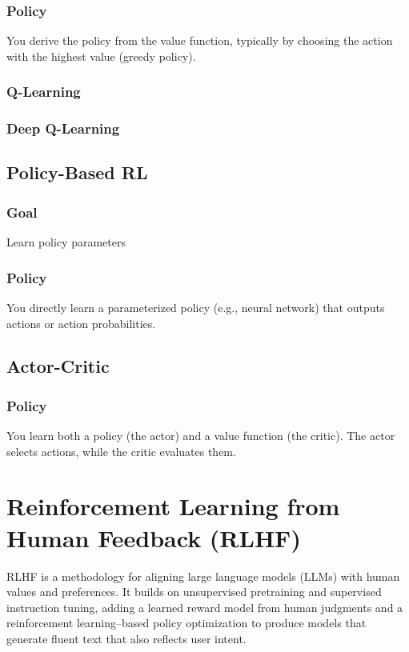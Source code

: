 \documentclass{article}
\begin{document}
\subsubsection{Policy} You derive the policy from the value function, typically by choosing the action with the highest value (greedy policy).

\subsubsection{Q-Learning}

\subsubsection{Deep Q-Learning}

\subsection{Policy-Based RL}

\subsubsection{Goal} Learn policy parameters

\subsubsection{Policy} You directly learn a parameterized policy (e.g., neural network) that outputs actions or action probabilities.

\subsection{Actor-Critic}

\subsubsection{Policy} You learn both a policy (the actor) and a value function (the critic). The actor selects actions, while the critic evaluates them.

\clearpage\newpage
\section{Reinforcement Learning from Human Feedback (RLHF)}

RLHF is a methodology for aligning large language models (LLMs) with human values and preferences. It builds on unsupervised pretraining and supervised instruction tuning, adding a learned reward model from human judgments and a reinforcement learning–based policy optimization to produce models that generate fluent text that also reflects user intent.
\end{document}
